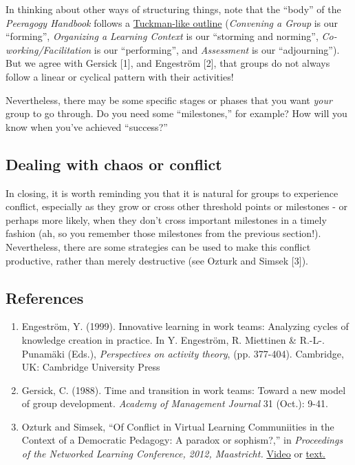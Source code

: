 In thinking about other ways of structuring things, note that the
``body'' of the \emph{Peeragogy Handbook} follows a
\href{http://en.wikipedia.org/wiki/Forming-storming-norming-performing}{Tuckman-like
outline} (\emph{Convening a Group} is our ``forming'', \emph{Organizing
a Learning Context} is our ``storming and norming'',
\emph{Co-working/Facilitation} is our ``performing'', and
\emph{Assessment} is our ``adjourning''). But we agree with Gersick
{[}1{]}, and Engeström {[}2{]}, that groups do not always follow a
linear or cyclical pattern with their activities!

Nevertheless, there may be some specific stages or phases that you want
\emph{your} group to go through. Do you need some ``milestones,'' for
example? How will you know when you've achieved ``success?''

\subsection{Dealing with chaos or conflict}

In closing, it is worth reminding you that it is natural for groups to
experience conflict, especially as they grow or cross other threshold
points or milestones - or perhaps more likely, when they don't cross
important milestones in a timely fashion (ah, so you remember those
milestones from the previous section!). Nevertheless, there are some
strategies can be used to make this conflict productive, rather than
merely destructive (see Ozturk and Simsek {[}3{]}).

\subsection{References}

\begin{enumerate}
\item
  Engeström, Y. (1999). Innovative learning in work teams: Analyzing
  cycles of knowledge creation in practice. In Y. Engeström, R.
  Miettinen \& R.-L-. Punamäki (Eds.), \emph{Perspectives on activity
  theory}, (pp. 377-404). Cambridge, UK: Cambridge University Press
\item
  Gersick, C. (1988). Time and transition in work teams: Toward a new
  model of group development. \emph{Academy of Management Journal} 31
  (Oct.): 9-41.
\item
  Ozturk and Simsek, ``Of Conflict in Virtual Learning Communiities in
  the Context of a Democratic Pedagogy: A paradox or sophism?,'' in
  \emph{Proceedings of the Networked Learning Conference, 2012,
  Maastricht.} \href{http://www.lancaster.ac.uk/fass/edres/seminars/Ozturk300311.htm}{Video} or \href{http://networkedlearningconference.org.uk/abstracts/pdf/ozturk.pdf}{text.}
\end{enumerate}
